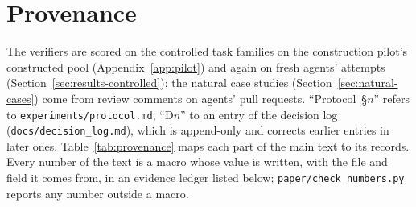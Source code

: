 \section{Provenance}
\label{app:provenance}
The verifiers are scored on the controlled task families on the construction pilot's constructed pool
(Appendix~\ref{app:pilot}) and again on fresh agents' attempts (Section~\ref{sec:results-controlled}); the natural case
studies (Section~\ref{sec:natural-cases}) come from review comments on agents' pull requests. ``Protocol~\S$n$''
refers to \texttt{experiments/protocol.md}, ``D$n$'' to an entry of the decision log (\texttt{docs/decision\_log.md}),
which is append-only and corrects earlier entries in later ones. Table~\ref{tab:provenance} maps each part of the main
text to its records. Every number of the text is a macro whose value is written, with the file and field it comes from,
in an evidence ledger listed below; \texttt{paper/check\_numbers.py} reports any number outside a macro.

